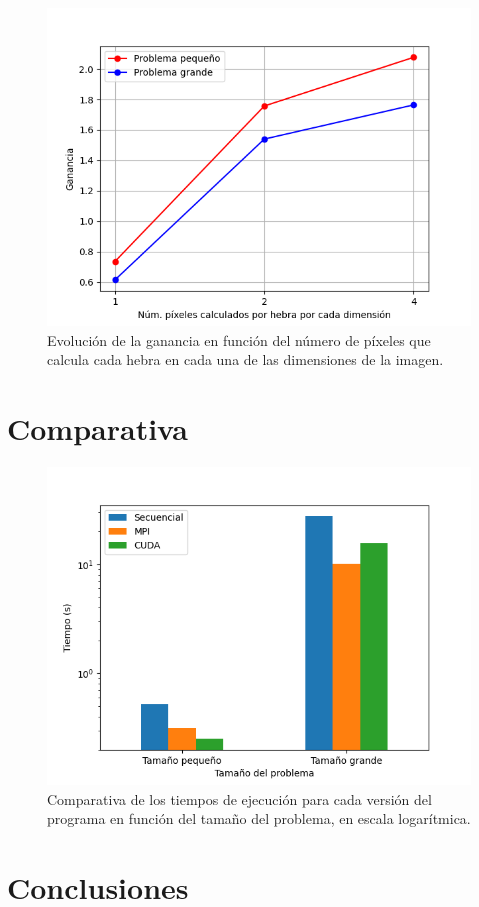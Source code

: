 \documentclass[11pt,a4paper]{article}
\begin{document}
\begin{figure}[H]
  \centering
  \includegraphics[scale=0.6]{img/speedup}
  \caption{Evolución de la ganancia en función del número de píxeles que calcula
  cada hebra en cada una de las dimensiones de la imagen.}
  \label{fig:speedup}
\end{figure}

\section{Comparativa}

\begin{figure}[H]
  \centering
  \includegraphics[scale=0.6]{img/comparison}
  \caption{Comparativa de los tiempos de ejecución para cada versión del programa en función
  del tamaño del problema, en escala logarítmica.}
\end{figure}

\section{Conclusiones}
\end{document}
